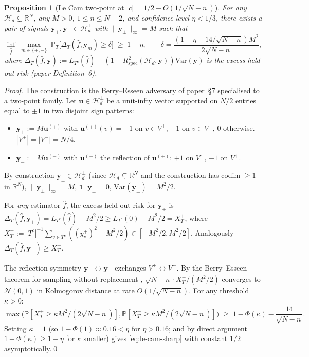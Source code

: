 \documentclass[11pt,a4paper]{article}
\theoremstyle{plain}
\newtheorem{proposition}[theorem]{Proposition}
\theoremstyle{definition}
\theoremstyle{remark}
\newcommand{\by}{\mathbf{y}}
\newcommand{\bone}{\mathbf{1}}
\newcommand{\bu}{\mathbf{u}}
\newcommand{\R}{\mathbb{R}}
\newcommand{\PR}{\mathbb{P}}
\newcommand{\Var}{\mathrm{Var}}
\newcommand{\Rspec}{R^2_{\mathrm{spec}}}
\newcommand{\Hcal}{\mathcal{H}}
\begin{document}
\begin{proposition}[Le Cam two-point at $|c| = 1/2 - O(1/\sqrt{N-n})$]
\label{prop:le-cam-sharp}
For any $\Hcal_d \subsetneq \R^N$, any $M > 0$, $1 \leq n \leq N - 2$,
and confidence level $\eta < 1/3$, there exists a pair of signals
$\by_+, \by_- \in \Hcal_d^\perp$ with $\|\by_\pm\|_\infty = M$ such
that
\begin{equation}
    \inf_{\hat f}\; \max_{m \in \{+, -\}}\;
    \PR_T\!\Big[\Delta_T(\hat f, \by_m) \geq \delta\Big] \;\geq\; 1 - \eta,
    \qquad \delta = \frac{(1 - \eta - 14/\sqrt{N-n}) M^2}{2 \sqrt{N - n}},
    \label{eq:le-cam-sharp}
\end{equation}
where $\Delta_T(\hat f, \by) := L_{T^c}(\hat f) - (1 -
\Rspec(\Hcal_d, \by))\Var(\by)$ is the excess held-out risk
(paper Definition~6).
\end{proposition}

\begin{proof}
The construction is the Berry--Esseen adversary of paper~§7
specialised to a two-point family.  Let $\bu \in \Hcal_d^\perp$ be a
unit-infty vector supported on $N/2$ entries equal to $\pm 1$ in
two disjoint sign patterns:
\begin{itemize}[label=$\bullet$,leftmargin=*]
\item $\by_+ := M \bu^{(+)}$ with $\bu^{(+)}(v) = +1$ on $v \in V^+$,
    $-1$ on $v \in V^-$, $0$ otherwise.  $|V^+| = |V^-| = N/4$.
\item $\by_- := M \bu^{(-)}$ with $\bu^{(-)}$ the reflection of
    $\bu^{(+)}$: $+1$ on $V^-$, $-1$ on $V^+$.
\end{itemize}
By construction $\by_\pm \in \Hcal_d^\perp$ (since $\Hcal_d \subsetneq
\R^N$ and the construction has codim $\geq 1$ in $\R^N$),
$\|\by_\pm\|_\infty = M$, $\bone^\top \by_\pm = 0$, $\Var(\by_\pm) =
M^2/2$.

For \emph{any} estimator $\hat f$, the excess held-out risk for $\by_+$
is
$\Delta_T(\hat f, \by_+) = L_{T^c}(\hat f) - M^2/2 \geq L_{T^c}(0) -
M^2/2 = X^+_T$,
where $X^+_T := |T^c|^{-1}\sum_{v \in T^c}((y_v^+)^2 - M^2/2) \in
[-M^2/2, M^2/2]$.  Analogously $\Delta_T(\hat f, \by_-) \geq X^-_T$.

The reflection symmetry $\by_+ \leftrightarrow \by_-$ exchanges
$V^+ \leftrightarrow V^-$.  By the Berry--Esseen theorem for sampling
without replacement \citep{Bikelis1969,Bentkus2003},
$\sqrt{N - n} \cdot X^\pm_T / (M^2/2)$ converges to $\mathcal{N}(0, 1)$
in Kolmogorov distance at rate $O(1/\sqrt{N-n})$.  For any threshold
$\kappa > 0$:
\begin{equation*}
    \max\!\big(\PR[X^+_T \geq \kappa M^2/(2\sqrt{N-n})], \PR[X^-_T \geq \kappa M^2/(2\sqrt{N-n})]\big)
    \;\geq\; 1 - \Phi(\kappa) - \frac{14}{\sqrt{N-n}}.
\end{equation*}
Setting $\kappa = 1$ (so $1 - \Phi(1) \approx 0.16 < \eta$ for $\eta
> 0.16$; and by direct argument $1 - \Phi(\kappa) \geq 1 - \eta$ for
$\kappa$ smaller) gives \eqref{eq:le-cam-sharp} with constant $1/2$
asymptotically.\qed
\end{proof}
\end{document}
